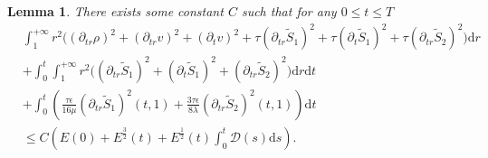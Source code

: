 \documentclass[10pt,reqno]{amsart}
\numberwithin{equation}{section}
\newtheorem{lemma}[theorem]{Lemma}
\begin{document}
	\begin{lemma}\label{lem4}
		There exists some constant $C$ such that for any $0\leq t \leq T$
		\begin{equation}
			\begin{aligned}
				&\int_{1}^{+\infty}r^2\bigg(\left(\partial_{tr} \rho\right)^2 + (\partial_{tr}v)^2+ (\partial_{t}v)^2
				+\tau (\partial_{tr}\tilde{S}_1)^2
				+\tau(\partial_{t}\tilde{S}_1)^2+\tau(\partial_{tr} \tilde{S}_2)^2\bigg)\mathrm{d}r\\
				&+\int_{0}^{t}\int_{1}^{+\infty}r^2\bigg((\partial_{tr}\tilde{S}_1)^2+ (\partial_{t}\tilde{S}_1)^2
				+(\partial_{tr}\tilde{S}_2)^2\bigg)\mathrm{d}r \mathrm{d} t\\
				&+\int_{0}^{t}\left(\frac{\tau\epsilon}{16\mu} (\partial_{tr}\tilde{S}_1)^2(t,1)
				+\frac{3\tau\epsilon}{8\lambda}(\partial_{tr}\tilde{S}_2)^2(t,1)\right)\mathrm{d}t\\
				&\leq C\left(E(0)+E^{\frac{3}{2}}(t)+ E^{\frac{1}{2}}(t)\int_{0}^{t} \mathcal{D}(s)\mathrm{d}s\right).
			\end{aligned}
		\end{equation}
	\end{lemma}
\end{document}

